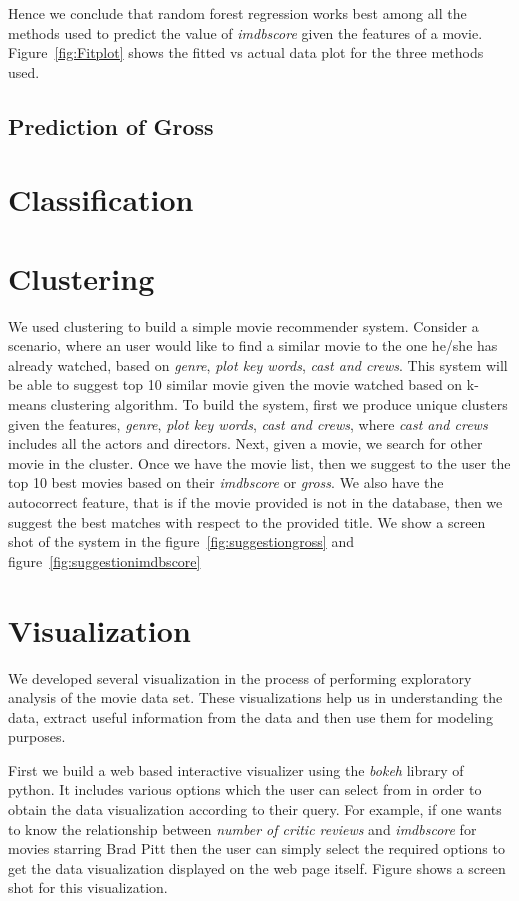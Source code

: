 \documentclass{article}%
\begin{document}
Hence we conclude that random forest regression works best among all the methods used to predict the value of \textit{imdbscore} given the features of a movie. Figure~\ref{fig:Fitplot} shows the fitted vs actual data plot for the three methods used. 

\subsection{Prediction of Gross}

\section{Classification}

\section{Clustering}

We used clustering to build a simple movie recommender system. Consider a scenario, where an user would like to find a similar movie to the one he/she has already watched, based on \textit{genre}, \textit{plot key words}, \textit{cast and crews}. This system will be able to suggest top 10 similar movie given the movie watched based on k-means clustering algorithm. 
To build the system, first we produce unique clusters given the features, \textit{genre}, \textit{plot key words}, \textit{cast and crews}, where \textit{cast and crews} includes all the actors and directors. Next, given a movie, we search for other movie in the cluster. Once we have the movie list, then we suggest to the user the top 10 best movies based on their \textit{imdbscore} or \textit{gross}. We also have the autocorrect feature, that is if the movie provided is not in the database, then we suggest the best matches with respect to the provided title. 
We show a screen shot of the system in the figure~\ref{fig:suggestiongross} and figure~\ref{fig:suggestionimdbscore} 


\section{Visualization}

We developed several visualization in the process of performing exploratory analysis of the movie data set. These visualizations help us in understanding the data, extract useful information from the data and then use them for modeling purposes. 

First we build a web based interactive visualizer using the \textit{bokeh} library of python. It includes various options which the user can select from in order to obtain the data visualization according to their query. For example, if one wants to know the relationship between \textit{number of critic reviews} and \textit{imdbscore} for movies starring Brad Pitt then the  user can simply select the required options to get the data visualization displayed on the web page itself. Figure shows a screen shot for this visualization. 
\end{document}
